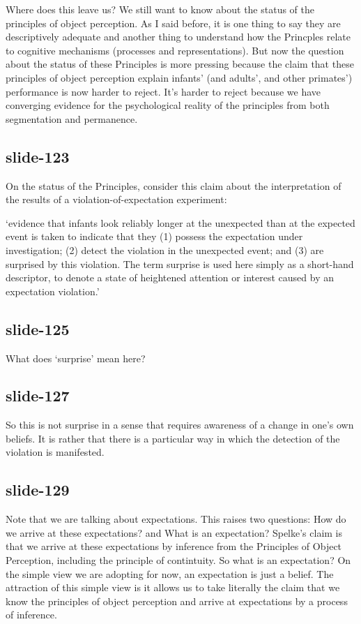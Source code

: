 \documentclass[12pt,\papersize]{extarticle}
\begin{document}
Where does this leave us?
We still want to know about the status of the principles of object perception.
As I said before, it is one thing to say they are descriptively adequate and another thing
to understand how the Princples relate to cognitive mechanisms (processes and 
representations).
But now the question about the status of these Principles is more pressing because 
the claim that these principles of object perception explain infants' (and adults', 
and other primates') performance is now harder to reject.
It's harder to reject because we have converging evidence for the psychological reality of 
the principles from both segmentation and permanence.
 
\subsection{slide-123}
On the status of the Principles, consider this claim about the interpretation of the 
results of a violation-of-expectation experiment:
 
‘evidence that infants look reliably longer at the unexpected than at the expected event is 
taken to indicate that they (1) possess the expectation under investigation; (2) detect the 
violation in the unexpected event; and (3) are surprised by this violation. The term 
surprise is used here simply as a short-hand descriptor, to denote a state of heightened 
attention or interest caused by an expectation violation.’ \citep[p.\ 168]{wang:2004_young}
 
\subsection{slide-125}
What does ‘surprise’ mean here?
 
\subsection{slide-127}
So this is not surprise in a sense that requires awareness of a change in one's own beliefs.
It is rather that there is a particular way in which the detection of the violation is 
manifested.
 
\subsection{slide-129}
Note that we are talking about expectations.
This raises two questions: How do we arrive at these expectations? and What is an 
expectation?
Spelke's claim is that we arrive at these expectations by inference from the Principles of 
Object Perception, including the principle of contintuity.
So what is an expectation?  
On the simple view we are adopting for now, an expectation is just a belief.
The attraction of this simple view is it allows us to take literally the claim that we know 
the principles of object perception and arrive at expectations by a process of inference.
 
\end{document}
